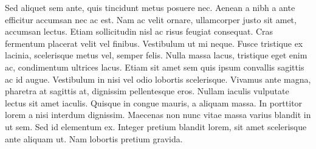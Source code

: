\documentclass[./main.tex]{subfiles}
\begin{document}
\par Sed aliquet sem ante, quis tincidunt metus posuere nec. Aenean a nibh a ante efficitur accumsan nec ac est. Nam ac velit ornare, ullamcorper justo sit amet, accumsan lectus. Etiam sollicitudin nisl ac risus feugiat consequat. Cras fermentum placerat velit vel finibus. Vestibulum ut mi neque. Fusce tristique ex lacinia, scelerisque metus vel, semper felis. Nulla massa lacus, tristique eget enim ac, condimentum ultrices lacus. Etiam sit amet sem quis ipsum convallis sagittis ac id augue. Vestibulum in nisi vel odio lobortis scelerisque. Vivamus ante magna, pharetra at sagittis at, dignissim pellentesque eros. Nullam iaculis vulputate lectus sit amet iaculis. Quisque in congue mauris, a aliquam massa. In porttitor lorem a nisi interdum dignissim. Maecenas non nunc vitae massa varius blandit in ut sem. Sed id elementum ex. Integer pretium blandit lorem, sit amet scelerisque ante aliquam ut. Nam lobortis pretium gravida.
\clearpage
\end{document}
